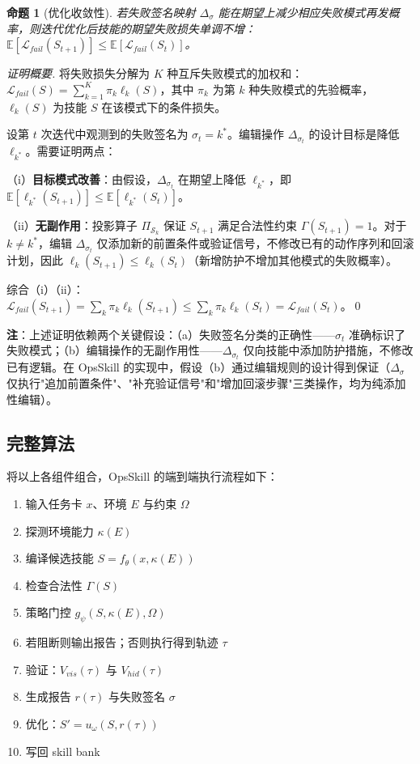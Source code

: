 \documentclass[11pt,a4paper]{ctexart}
\newtheorem{proposition}{命题}
\begin{document}
\begin{proposition}[优化收敛性]
若失败签名映射 $\Delta_\sigma$ 能在期望上减少相应失败模式再发概率，则迭代优化后技能的期望失败损失单调不增：$\mathbb{E}[\mathcal{L}_{fail}(S_{t+1})] \le \mathbb{E}[\mathcal{L}_{fail}(S_t)]$。
\end{proposition}

\begin{proof}[证明概要]
将失败损失分解为 $K$ 种互斥失败模式的加权和：$\mathcal{L}_{fail}(S) = \sum_{k=1}^{K} \pi_k \ell_k(S)$，其中 $\pi_k$ 为第 $k$ 种失败模式的先验概率，$\ell_k(S)$ 为技能 $S$ 在该模式下的条件损失。

设第 $t$ 次迭代中观测到的失败签名为 $\sigma_t = k^*$。编辑操作 $\Delta_{\sigma_t}$ 的设计目标是降低 $\ell_{k^*}$。需要证明两点：

（i）\textbf{目标模式改善}：由假设，$\Delta_{\sigma_t}$ 在期望上降低 $\ell_{k^*}$，即 $\mathbb{E}[\ell_{k^*}(S_{t+1})] \le \mathbb{E}[\ell_{k^*}(S_t)]$。

（ii）\textbf{无副作用}：投影算子 $\Pi_{\mathcal{S}_k}$ 保证 $S_{t+1}$ 满足合法性约束 $\Gamma(S_{t+1})=1$。对于 $k \ne k^*$，编辑 $\Delta_{\sigma_t}$ 仅添加新的前置条件或验证信号，不修改已有的动作序列和回滚计划，因此 $\ell_k(S_{t+1}) \le \ell_k(S_t)$（新增防护不增加其他模式的失败概率）。

综合（i）（ii）：$\mathcal{L}_{fail}(S_{t+1}) = \sum_k \pi_k \ell_k(S_{t+1}) \le \sum_k \pi_k \ell_k(S_t) = \mathcal{L}_{fail}(S_t)$。\qed
\end{proof}

\noindent \textbf{注}：上述证明依赖两个关键假设：（a）失败签名分类的正确性——$\sigma_t$ 准确标识了失败模式；（b）编辑操作的无副作用性——$\Delta_{\sigma_t}$ 仅向技能中添加防护措施，不修改已有逻辑。在 OpsSkill 的实现中，假设（b）通过编辑规则的设计得到保证（$\Delta_\sigma$ 仅执行"追加前置条件"、"补充验证信号"和"增加回滚步骤"三类操作，均为纯添加性编辑）。

\subsection{完整算法}

将以上各组件组合，OpsSkill 的端到端执行流程如下：

\begin{enumerate}[leftmargin=2em]
  \item 输入任务卡 $x$、环境 $E$ 与约束 $\Omega$
  \item 探测环境能力 $\kappa(E)$
  \item 编译候选技能 $S = f_\theta(x, \kappa(E))$
  \item 检查合法性 $\Gamma(S)$
  \item 策略门控 $g_\psi(S, \kappa(E), \Omega)$
  \item 若阻断则输出报告；否则执行得到轨迹 $\tau$
  \item 验证：$V_{vis}(\tau)$ 与 $V_{hid}(\tau)$
  \item 生成报告 $r(\tau)$ 与失败签名 $\sigma$
  \item 优化：$S' = u_\omega(S, r(\tau))$
  \item 写回 skill bank
\end{enumerate}
\end{document}
